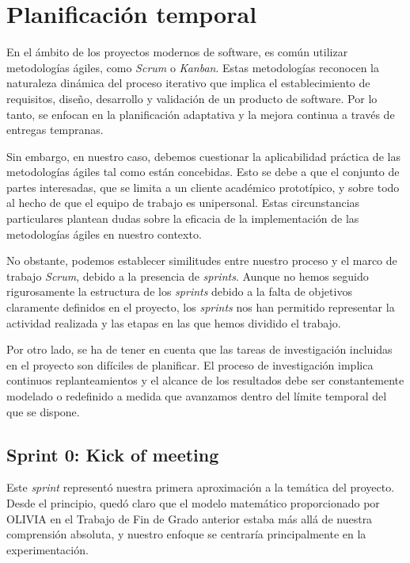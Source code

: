 \section{Planificación temporal}

En el ámbito de los proyectos modernos de software, es común utilizar metodologías ágiles, como \textit{Scrum} 
o \textit{Kanban}. Estas metodologías reconocen la naturaleza dinámica del proceso iterativo que implica el 
establecimiento de requisitos, diseño, desarrollo y validación de un producto de software. Por lo tanto, 
se enfocan en la planificación adaptativa y la mejora continua a través de entregas tempranas.

Sin embargo, en nuestro caso, debemos cuestionar la aplicabilidad práctica de las metodologías ágiles 
tal como están concebidas. Esto se debe a que el conjunto de partes interesadas, que se limita a un 
cliente académico prototípico, y sobre todo al hecho de que el equipo de trabajo es unipersonal. Estas 
circunstancias particulares plantean dudas sobre la eficacia de la implementación de las metodologías 
ágiles en nuestro contexto.

No obstante, podemos establecer similitudes entre nuestro proceso y el marco de trabajo \textit{Scrum}, 
debido a la presencia de \textit{sprints}. Aunque no hemos seguido rigurosamente la estructura de los \textit{sprints} 
debido a la falta de objetivos claramente definidos en el proyecto, los \textit{sprints} nos han permitido 
representar la actividad realizada y las etapas en las que hemos dividido el trabajo.

Por otro lado, se ha de tener en cuenta que las tareas de investigación incluidas en el proyecto son 
difíciles de planificar. El proceso de investigación implica continuos replanteamientos y el alcance de 
los resultados debe ser constantemente modelado o redefinido a medida que avanzamos dentro del límite 
temporal del que se dispone.

\subsection{Sprint 0: Kick of meeting}

Este \textit{sprint} representó nuestra primera aproximación a la temática del proyecto. Desde el principio, quedó 
claro que el modelo matemático proporcionado por OLIVIA en el Trabajo de Fin de Grado anterior estaba más allá de 
nuestra comprensión absoluta, y nuestro enfoque se centraría principalmente en la experimentación.

